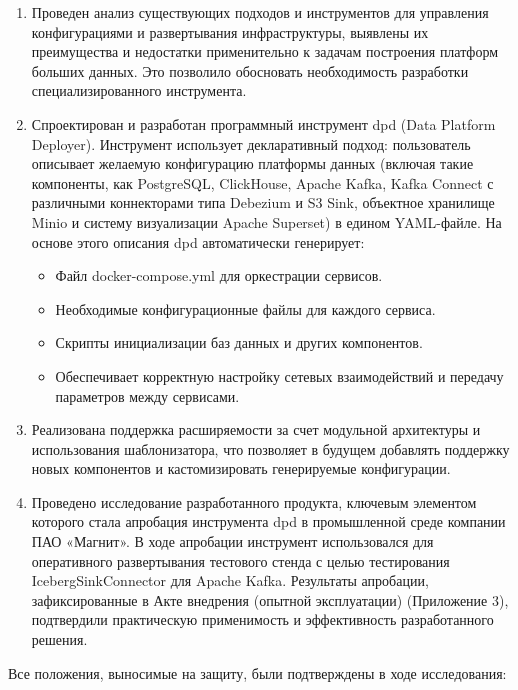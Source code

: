 \begin{enumerate}[1.]
    \item Проведен анализ существующих подходов и инструментов для управления конфигурациями и развертывания инфраструктуры, выявлены их преимущества и недостатки применительно к задачам построения платформ больших данных. Это позволило обосновать необходимость разработки специализированного инструмента.
    \item Спроектирован и разработан программный инструмент dpd (Data Platform Deployer). Инструмент использует декларативный подход: пользователь описывает желаемую конфигурацию платформы данных (включая такие компоненты, как PostgreSQL, ClickHouse, Apache Kafka, Kafka Connect с различными коннекторами типа Debezium и S3 Sink, объектное хранилище Minio и систему визуализации Apache Superset) в едином YAML-файле. На основе этого описания dpd автоматически генерирует:
          \begin{itemize}
              \item Файл docker-compose.yml для оркестрации сервисов.
              \item Необходимые конфигурационные файлы для каждого сервиса.
              \item Скрипты инициализации баз данных и других компонентов.
              \item Обеспечивает корректную настройку сетевых взаимодействий и передачу параметров между сервисами.
          \end{itemize}
    \item Реализована поддержка расширяемости за счет модульной архитектуры и использования шаблонизатора, что позволяет в будущем добавлять поддержку новых компонентов и кастомизировать генерируемые конфигурации.
    \item Проведено исследование разработанного продукта, ключевым элементом которого стала апробация инструмента dpd в промышленной среде компании ПАО «Магнит». В ходе апробации инструмент использовался для оперативного развертывания тестового стенда с целью тестирования IcebergSinkConnector для Apache Kafka. Результаты апробации, зафиксированные в Акте внедрения (опытной эксплуатации) (Приложение 3), подтвердили практическую применимость и эффективность разработанного решения.
\end{enumerate}
Все положения, выносимые на защиту, были подтверждены в ходе исследования:

